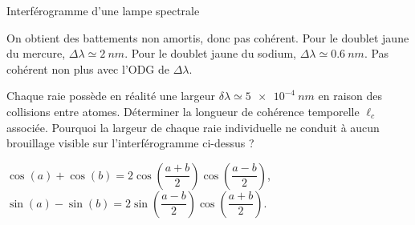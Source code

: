 \begin{exo}[PC][2][colle]{Interférogramme d'une lampe spectrale}
\begin{quest}
{%


On obtient des battements non amortis, donc pas cohérent. Pour le doublet jaune du mercure, $\Delta \lambda \simeq \SI{2}{nm}$. Pour le doublet jaune  du sodium, $\Delta \lambda \simeq \SI{0.6}{nm}$. Pas cohérent non plus avec l'ODG de $\Delta \lambda$.
}

\item Chaque raie possède en réalité une largeur $\delta \lambda \simeq \SI{5e-4}{nm}$ en raison des collisions entre atomes. Déterminer la longueur de cohérence temporelle $\ell_c$ associée. Pourquoi la largeur de chaque raie individuelle ne conduit à aucun brouillage visible sur l'interférogramme ci-dessus ?

\end{quest}

\noindent
$\cos(a) + \cos(b)  = 2\cos\left(\dfrac{a+b}{2}\right)\cos\left(\dfrac{a-b}{2}\right)$,
$\sin(a) - \sin(b)   = 2\sin\left(\dfrac{a-b}{2}\right)\cos\left(\dfrac{a+b}{2}\right)$.

\end{exo}



